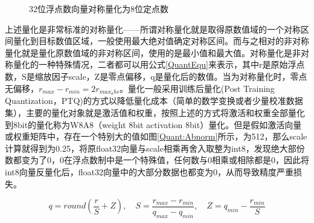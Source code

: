 \begin{figure}[htbp!]
	\centering
	\caption{32位浮点数向量对称量化为8位定点数}
	\label{Quant}
\end{figure}

上述量化是非常标准的对称量化——所谓对称量化就是取得原数值域的一个对称区间量化到目标数值区域，一般使用最大绝对值确定对称区间。而与之相对的非对称量化就是量化原数值域的非对称区间，使用的是最小值和最大值。对称量化是非对称量化的一种特殊情况，二者都可以用公式\ref{QuantEqu}来表示，其中r是原始浮点数，S是缩放因子scale，Z是零点偏移，q是量化后的数值。当为对称量化时，零点无偏移，$r_{max}-r_{min}=2r_{max_abs}$。量化一般采用训练后量化(Post Training Quantization，PTQ)的方式以降低量化成本（简单的数学变换或者少量校准数据集），主要的量化对象就是激活值和权重，按照上述的方式将激活和权重全部量化到8bit的量化称为W8A8（weight 8bit activation 8bit）量化。但是假如激活向量或权重矩阵中，存在一个特别大的值如图\ref{Quant:Abnorm}所示，为512，那么scale计算就得到为0.25，将原float32向量与scale相乘再舍入取整为int8，发现绝大部份数都变为了0，0在浮点数制中是一个特殊值，任何数与0相乘或相除都是0，因此将int8向量反量化后，float32向量中的大部分数据也都变为0，从而导致精度严重损失。

\begin{equation}
    q = round\left(\frac{r}{S} + Z\right), \quad S=\frac{r_{max}-r_{min}}{q_{max}-q_{min}}, \quad Z=q_{min}-\frac{r_{min}}{S}
    \label{QuantEqu}
\end{equation}

